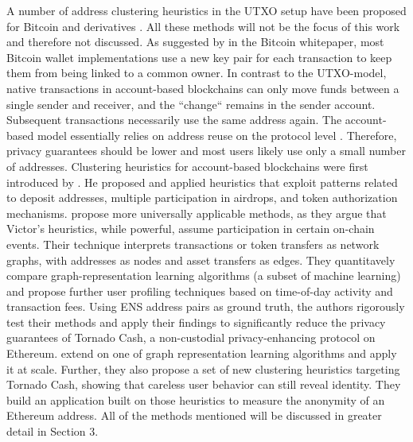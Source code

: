 \documentclass[12pt,a4paper,titlepage,oneside,english]{article}
\begin{document}
A number of address clustering heuristics in the UTXO setup have been proposed for Bitcoin and derivatives \citep{Androulaki2013, Meiklejohn2013, Haslhofer2016, jourdan2018, kappos2022}. All these methods will not be the focus of this work and therefore not discussed. As suggested by \cite{nakamotoBitcoin2008} in the Bitcoin whitepaper, most Bitcoin wallet implementations use a new key pair for each transaction to keep them from being linked to a common owner. \newline
In contrast to the UTXO-model, native transactions in account-based blockchains can only move funds between a single sender and receiver, and the ``change`` remains in the sender account. Subsequent transactions necessarily use the same address again. The account-based model essentially relies on address reuse on the protocol level \citep{Beres2020}. Therefore, privacy guarantees should be lower and most users likely use only a small number of addresses. \newline
Clustering heuristics for account-based blockchains were first introduced by \cite{FV:17}. He proposed and applied heuristics that exploit patterns related to deposit addresses, multiple participation in airdrops, and token authorization mechanisms. \newline
\cite{Beres2020} propose more universally applicable methods, as they argue that Victor’s heuristics, while powerful, assume participation in certain on-chain events. Their technique interprets transactions or token transfers as network graphs, with addresses as nodes and asset transfers as edges. They quantitavely compare graph-representation learning algorithms (a subset of machine learning) and propose further user profiling techniques based on time-of-day activity and transaction fees. Using ENS address pairs as ground truth, the authors rigorously test their methods and apply their findings to significantly reduce the privacy guarantees of Tornado Cash, a non-custodial privacy-enhancing protocol on Ethereum. \newline
\cite{wu2022tutela} extend on one of \cite{Beres2020} graph representation learning %
 algorithms and apply it at scale. Further, they also propose a set of new clustering heuristics targeting Tornado Cash,  showing that careless user behavior can still reveal identity. They build an application built on those heuristics to measure the anonymity of an Ethereum address. All of the methods mentioned will be discussed in greater detail in Section 3. \newline
\end{document}
